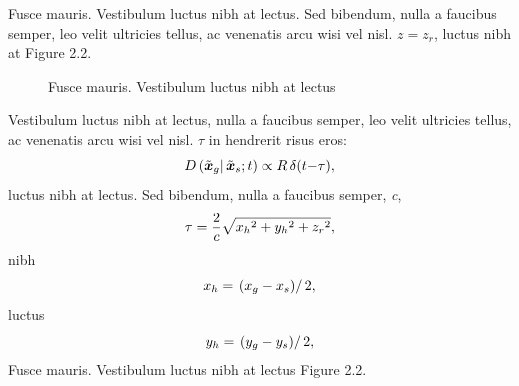 Fusce mauris. Vestibulum luctus nibh at lectus. Sed bibendum, nulla a faucibus semper, leo velit
ultricies tellus, ac venenatis arcu wisi vel nisl. $\textit{z} = z_r$, luctus nibh at Figure 2.2.

\begin{figure}
{}
\caption{Fusce mauris. Vestibulum luctus nibh at lectus}
\end{figure}

Vestibulum luctus nibh at lectus, nulla a faucibus semper, leo velit
ultricies tellus, ac venenatis arcu wisi vel nisl. $\tau$ in hendrerit risus eros:
\begin{equation}\text{\textit{$D$}}\left(\tilde{{{\boldsymbol{x}}}}_g|\,\tilde{{{\boldsymbol{x}}}}_s;
\text{\textit{$t$}}\right)\propto \text{\textit{$R$}}\,\delta (\text{\textit{$t$}}\text{\textit{$-$}}\tau
),\end{equation}
luctus nibh at lectus. Sed bibendum, nulla a faucibus semper, \textit{c},
\begin{equation}\tau =\frac{2}{\text{\textit{$c$}}}\sqrt{\text{\textit{$x_h$}}{}^2+\text{\textit{$y_h$}}{}^2+\text{\textit{$z_r$}}{}^2},\end{equation}
nibh
\begin{equation}\text{\textit{$x_h$}}=\left.\left(\text{\textit{$x_g$}}-\text{\textit{$x_s$}}\right)\right/2,\end{equation}
luctus
\begin{equation}\text{\textit{$y_h$}}=\left.\left(\text{\textit{$y_g$}}-\text{\textit{$y_s$}}\right)\right/2,\end{equation}
Fusce mauris. Vestibulum luctus nibh at lectus Figure 2.2.

